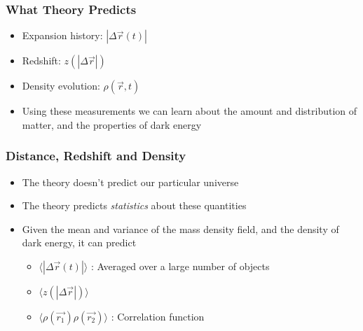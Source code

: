 \documentclass{beamer}
\begin{document}
\frame
{

    \frametitle{What Theory Predicts}


    \begin{itemize}

            

        \item Expansion history: {\color{gold} $|\Delta \vec{r} (t)|$ }


        \item Redshift: {\color{gold} $z(|\Delta \vec{r}|)$}


        \item Density evolution: {\color{gold} $\rho(\vec{r},t)$}


        \item Using these measurements we can learn about the amount and
            distribution of matter, and the properties of dark energy



    \end{itemize}

}

\frame
{

    \frametitle{Distance, Redshift and Density}


    \begin{itemize}

        \item The theory doesn't predict our particular universe

        \item The theory predicts {\em statistics} about these quantities
            
        \item Given the mean and variance of the mass density field, and the
            density of dark energy, it can predict

            \begin{itemize}

                \item {\color{gold} $\langle |\Delta \vec{r} (t)| \rangle$ }: Averaged
                    over a large number of objects

                \item {\color{gold} $\langle z(|\Delta \vec{r}|) \rangle$}

                \item {\color{gold} $\langle \rho(\vec{r_1}) \rho(\vec{r_2})
                    \rangle$ }: Correlation function

            \end{itemize}

    \end{itemize}

}
\end{document}
